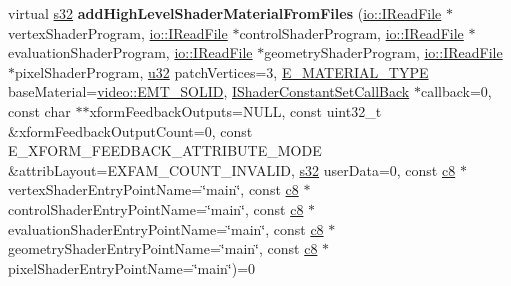 \begin{DoxyCompactItemize}
\item 
virtual \hyperlink{namespaceirr_ac66849b7a6ed16e30ebede579f9b47c6}{s32} {\bfseries add\+High\+Level\+Shader\+Material\+From\+Files} (\hyperlink{classirr_1_1io_1_1IReadFile}{io\+::\+I\+Read\+File} $\ast$vertex\+Shader\+Program, \hyperlink{classirr_1_1io_1_1IReadFile}{io\+::\+I\+Read\+File} $\ast$control\+Shader\+Program, \hyperlink{classirr_1_1io_1_1IReadFile}{io\+::\+I\+Read\+File} $\ast$evaluation\+Shader\+Program, \hyperlink{classirr_1_1io_1_1IReadFile}{io\+::\+I\+Read\+File} $\ast$geometry\+Shader\+Program, \hyperlink{classirr_1_1io_1_1IReadFile}{io\+::\+I\+Read\+File} $\ast$pixel\+Shader\+Program, \hyperlink{namespaceirr_a0416a53257075833e7002efd0a18e804}{u32} patch\+Vertices=3, \hyperlink{namespaceirr_1_1video_ac8e9b6c66f7cebabd1a6d30cbc5430f1}{E\+\_\+\+M\+A\+T\+E\+R\+I\+A\+L\+\_\+\+T\+Y\+PE} base\+Material=\hyperlink{namespaceirr_1_1video_ac8e9b6c66f7cebabd1a6d30cbc5430f1a9bc471b9c18c9e2d20496004d2a2e803}{video\+::\+E\+M\+T\+\_\+\+S\+O\+L\+ID}, \hyperlink{classirr_1_1video_1_1IShaderConstantSetCallBack}{I\+Shader\+Constant\+Set\+Call\+Back} $\ast$callback=0, const char $\ast$$\ast$xform\+Feedback\+Outputs=N\+U\+LL, const uint32\+\_\+t \&xform\+Feedback\+Output\+Count=0, const E\+\_\+\+X\+F\+O\+R\+M\+\_\+\+F\+E\+E\+D\+B\+A\+C\+K\+\_\+\+A\+T\+T\+R\+I\+B\+U\+T\+E\+\_\+\+M\+O\+DE \&attrib\+Layout=E\+X\+F\+A\+M\+\_\+\+C\+O\+U\+N\+T\+\_\+\+I\+N\+V\+A\+L\+ID, \hyperlink{namespaceirr_ac66849b7a6ed16e30ebede579f9b47c6}{s32} user\+Data=0, const \hyperlink{namespaceirr_a9395eaea339bcb546b319e9c96bf7410}{c8} $\ast$vertex\+Shader\+Entry\+Point\+Name=\char`\"{}main\char`\"{}, const \hyperlink{namespaceirr_a9395eaea339bcb546b319e9c96bf7410}{c8} $\ast$control\+Shader\+Entry\+Point\+Name=\char`\"{}main\char`\"{}, const \hyperlink{namespaceirr_a9395eaea339bcb546b319e9c96bf7410}{c8} $\ast$evaluation\+Shader\+Entry\+Point\+Name=\char`\"{}main\char`\"{}, const \hyperlink{namespaceirr_a9395eaea339bcb546b319e9c96bf7410}{c8} $\ast$geometry\+Shader\+Entry\+Point\+Name=\char`\"{}main\char`\"{}, const \hyperlink{namespaceirr_a9395eaea339bcb546b319e9c96bf7410}{c8} $\ast$pixel\+Shader\+Entry\+Point\+Name=\char`\"{}main\char`\"{})=0\hypertarget{classirr_1_1video_1_1IGPUProgrammingServices_adf457fca744406fb2290dd1334162eac}{}\label{classirr_1_1video_1_1IGPUProgrammingServices_adf457fca744406fb2290dd1334162eac}


\end{DoxyCompactItemize}
